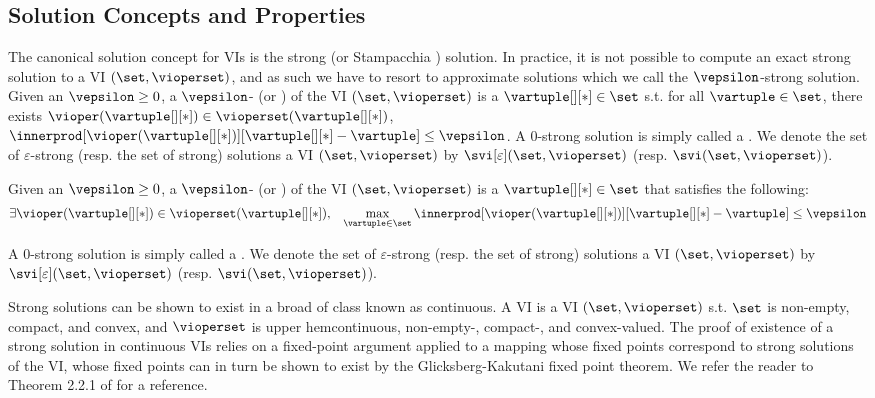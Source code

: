 \subsection{Solution Concepts and Properties}
The canonical solution concept for VIs is the strong (or Stampacchia \cite{lions1967variational}) solution. In practice, it is not possible to compute an exact strong solution to a VI $(\set, \vioperset)$, and as such we have to resort to approximate solutions which we call the $\vepsilon$-strong solution. Given an  $\vepsilon \geq 0$, a $\vepsilon$- (or )  of the VI $(\set, \vioperset)$ is a $\vartuple[][*] \in \set$ s.t. for all $\vartuple \in \set$, there exists $\vioper(\vartuple[][*]) \in \vioperset(\vartuple[][*])$, $\innerprod[{\vioper(\vartuple[][*])}][{\vartuple[][*]  - \vartuple }] \leq \vepsilon$.
A $0$-strong solution is simply called a . 
We denote the set of $\varepsilon$-strong (resp. the set of strong) solutions a VI $(\set, \vioperset)$ by $\svi[\varepsilon](\set, \vioperset)$ (resp. $\svi(\set, \vioperset)$).
\begin{definition}
    Given an  $\vepsilon \geq 0$, a $\vepsilon$- (or )  of the VI $(\set, \vioperset)$ is a $\vartuple[][*] \in \set$ that satisfies the following:
    \begin{align}
        &\exists \vioper(\vartuple[][*]) \in \vioperset(\vartuple[][*]), & \max_{\vartuple \in \set} \innerprod[{\vioper(\vartuple[][*])}][{\vartuple[][*]  - \vartuple }] \leq \vepsilon
    \end{align}

    A $0$-strong solution is simply called a . 
    We denote the set of $\varepsilon$-strong (resp. the set of strong) solutions a VI $(\set, \vioperset)$ by $\svi[\varepsilon](\set, \vioperset)$ (resp. $\svi(\set, \vioperset)$).
\end{definition}
\fi

Strong solutions can be shown to exist in a broad of class known as continuous. A  VI is a VI $(\set, \vioperset)$ s.t. $\set$ is non-empty, compact, and convex, and $\vioperset$ is  upper hemcontinuous, non-empty-, compact-, and convex-valued.
% 
The proof of existence of a strong solution in continuous VIs relies on a fixed-point argument applied to a mapping whose fixed points correspond to strong solutions of the VI, whose fixed points can in turn be shown to exist by the Glicksberg-Kakutani fixed point theorem. We refer the reader to Theorem 2.2.1 of \citet{facchinei2003finite} for a reference.

